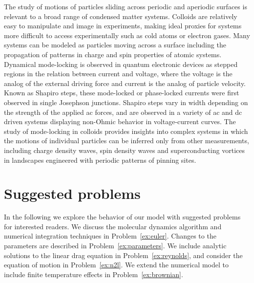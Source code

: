 \documentclass[preprint,showpacs,preprintnumbers,amsmath,amssymb,aps,prb]{revtex4-1}
\theoremstyle{remark}
\begin{document}
The study of motions of particles 
sliding across periodic and aperiodic surfaces 
is relevant 
to a broad range of condensed matter systems.
Colloids are 
relatively easy to 
manipulate and image in experiments,
making ideal proxies 
for systems
more difficult to access experimentally 
such as cold atoms or electron gases.\cite{Grier2003}
Many systems can be modeled
as particles moving across a surface
including 
the propagation of patterns
in charge and spin properties of atomic systems.
Dynamical mode-locking 
is 
observed in %
quantum electronic
devices as 
stepped regions in the relation between current and voltage,
where the voltage is the analog of the external driving force
and current is the analog of particle velocity.
Known as Shapiro steps, 
these mode-locked or phase-locked currents
were first
observed in single Josephson junctions\cite{Shapiro1963, Golubov2004}.
Shapiro steps vary in width depending on the strength of the
applied ac forces,
and are observed in a variety of ac and dc driven systems
displaying
non-Ohmic behavior in voltage-current curves.
The study of 
mode-locking in colloids provides insights
into 
complex %
systems in which 
the motions of individual particles can  be inferred only
from other measurements, 
including
charge density waves, spin density waves
and superconducting vortices in landscapes 
engineered with periodic patterns of pinning sites.\cite{Reichhardt2000}

\section{Suggested problems}
\label{sec:problems}	

In the following
we explore the behavior of our model
with suggested problems for interested readers.
We discuss the molecular dynamics algorithm
and
numerical integration techniques in Problem~\ref{ex:euler}.
Changes to the parameters are described in 
Problem~\ref{ex:parameters}.
We include analytic solutions to  the 
linear drag equation in Problem~\ref{ex:reynolds}, and consider
the equation of motion in Problem~\ref{ex:n2l}.
We extend the numerical model  
to include finite temperature effects
in Problem~\ref{ex:brownian}.
\end{document}
